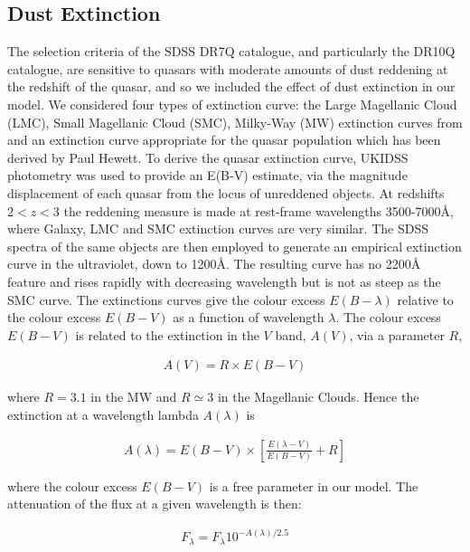 \subsection{Dust Extinction} 

The selection criteria of the SDSS DR7Q catalogue, and particularly the DR10Q catalogue, are sensitive to quasars with moderate amounts of dust reddening \citep[possibly as high as E(B-V) $\sim$ 0.5;][]{richards03} at the redshift of the quasar, and so we included the effect of dust extinction in our model. 
We considered four types of extinction curve: the Large Magellanic Cloud (LMC), Small Magellanic Cloud (SMC), Milky-Way (MW) extinction curves from \citet{pei92} and an extinction curve appropriate for the quasar population which has been derived by Paul Hewett. 
To derive the quasar extinction curve, UKIDSS photometry was used to provide an E(B-V) estimate, via the magnitude displacement of each quasar from the locus of unreddened objects. 
At redshifts $2 < z < 3$ the reddening measure is made at rest-frame wavelengths 3500-7000\AA, where Galaxy, LMC and SMC extinction curves are very similar. 
The SDSS spectra of the same objects are then employed to generate an empirical extinction curve in the ultraviolet, down to 1200\AA. 
The resulting curve has no 2200\AA~ feature and rises rapidly with decreasing wavelength but is not as steep as the SMC curve. 
The extinctions curves give the colour excess $E(B-\lambda)$ relative to the colour excess $E(B-V)$ as a function of wavelength $\lambda$. 
The colour excess $E(B-V)$ is related to the extinction in the $V$ band, $A(V)$, via a parameter $R$, 

\begin{eqnarray}
  A(V) = R \times E(B -V )
\end{eqnarray}

where $R = 3.1$ in the MW and $R \simeq 3$ in the Magellanic Clouds. 
Hence the extinction at a wavelength lambda $A(\lambda)$ is 

\begin{eqnarray}
  A(\lambda) = E(B-V) \times \left[ \frac{E(\lambda-V)}{E(B-V)} + R \right] 
\end{eqnarray}

where the colour excess $E(B-V)$ is a free parameter in our model. 
The attenuation of the flux at a given wavelength is then:

\begin{eqnarray}
  F_\lambda = F_\lambda10^{-A(\lambda)/2.5}
\end{eqnarray}

